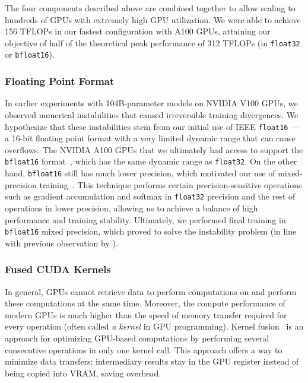 \documentclass[twoside,11pt]{article}
\begin{document}
The four components described above are combined together to allow scaling to hundreds of GPUs with extremely high GPU utilization. We were able to achieve 156 TFLOPs in our fastest configuration with A100 GPUs, attaining our objective of half of the theoretical peak performance of 312 TFLOPs (in \texttt{float32} or \texttt{bfloat16}).

\subsubsection{Floating Point Format}

In earlier experiments with 104B-parameter models on NVIDIA V100 GPUs, we observed numerical instabilities that caused irreversible training divergences.
We hypothesize that these instabilities stem from our initial use of IEEE \texttt{float16} --- a 16-bit floating point format with a very limited dynamic range that can cause overflows.
The NVIDIA A100 GPUs that we ultimately had access to support the \texttt{bfloat16} format~\citep{bf16blog,kalamkar2019study}, which has the same dynamic range as \texttt{float32}.
On the other hand, \texttt{bfloat16} still has much lower precision, which motivated our use of mixed-precision training~\citep{micikevicius2018mixed}. This technique performs certain precision-sensitive operations such as gradient accumulation and softmax in \texttt{float32} precision and the rest of operations in lower precision, allowing us to achieve a balance of high performance and training stability.
Ultimately, we performed final training in \texttt{bfloat16} mixed precision, which proved to solve the instability problem (in line with previous observation by \citealp{smith2022using}).


\subsubsection{Fused CUDA Kernels}

In general, GPUs cannot retrieve data to perform computations on and perform these computations at the same time. Moreover, the compute performance of modern GPUs is much higher than the speed of memory transfer required for every operation (often called \textit{a kernel} in GPU programming).
Kernel fusion~\citep{kernel_fusion} is an approach for optimizing GPU-based computations by performing several consecutive operations in only one kernel call. This approach offers a way to minimize data transfers: intermediary results stay in the GPU register instead of being copied into VRAM, saving overhead. 
\end{document}
